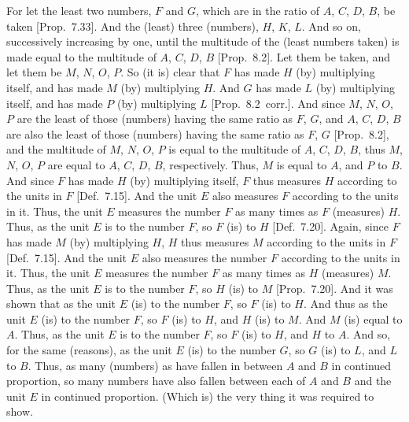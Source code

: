 \begin{Parallel}{}{}
{For let the least two numbers, $F$ and $G$, which are in the
ratio of $A$, $C$, $D$, $B$, be taken [Prop.~7.33]. And the (least) three (numbers), $H$, $K$, $L$. And so on, successively increasing by one, until the multitude
of the (least numbers taken) is made  equal to the multitude of $A$, $C$, $D$, $B$
[Prop.~8.2]. Let them be taken, and let
them be $M$, $N$, $O$, $P$. So (it is) clear that $F$ has made $H$ (by)
multiplying itself, and has made $M$ (by) multiplying $H$. And $G$
has made $L$ (by) multiplying itself, and has made $P$ (by) multiplying $L$
[Prop.~8.2~corr.]. And since $M$, $N$, $O$, $P$
are the least of those (numbers) having the same ratio as $F$, $G$, and
$A$, $C$, $D$, $B$ are also the least of those (numbers) having the
same ratio as $F$, $G$ [Prop.~8.2], and the multitude
of $M$, $N$, $O$, $P$ is equal to the multitude of $A$, $C$, $D$, $B$, thus
$M$, $N$, $O$, $P$ are  equal to  $A$, $C$, $D$, $B$, respectively. 
Thus, $M$ is equal to $A$, and $P$ to $B$. And since $F$ has made
$H$ (by) multiplying itself, $F$ thus measures $H$ according to the
units in $F$ [Def.~7.15].  And the unit $E$ also
measures $F$ according to the units in it. Thus, the unit $E$
measures the number $F$ as many times as $F$ (measures) $H$. Thus,
as the unit $E$ is to the number $F$, so $F$ (is) to $H$ [Def.~7.20]. Again, since $F$ has made $M$ (by)
multiplying $H$, $H$ thus measures $M$ according to the units in $F$
 [Def.~7.15].  And the unit $E$ also measures
 the number $F$ according to the units in it. Thus, the unit $E$ measures
 the number $F$ as many times as $H$ (measures) $M$. Thus,
 as the unit $E$ is to the number $F$, so $H$ (is) to $M$ [Prop.~7.20]. And it was shown
 that as the unit $E$ (is) to the number $F$, so $F$ (is) to $H$. And thus
 as the unit $E$ (is) to the number $F$, so $F$ (is) to $H$, and $H$ (is)
 to $M$. And $M$ (is) equal to $A$. Thus, as the unit $E$ is to the number
 $F$, so $F$ (is) to $H$, and $H$ to $A$. And so, for the same (reasons),
 as the unit $E$ (is) to the number $G$, so $G$ (is) to $L$, and $L$ to
 $B$.  Thus, as many  (numbers)  as have fallen
 in between $A$ and $B$  in continued proportion,  so many numbers  have also fallen between each of $A$ and $B$ and the unit 
 $E$ in continued proportion. (Which is) the very thing it was required to show. }
\end{Parallel}

